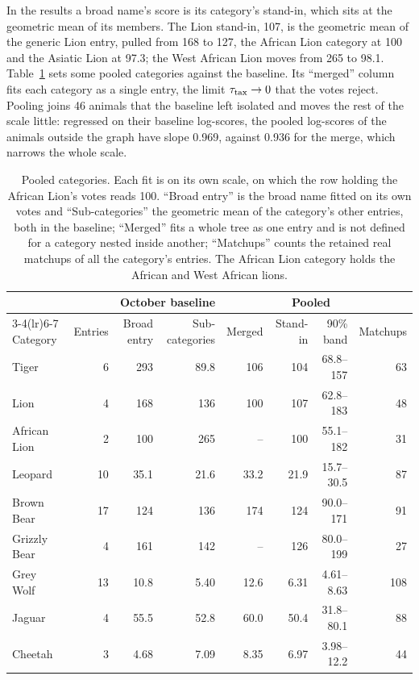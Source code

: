 \documentclass[11pt]{article}
\begin{document}
In the results a broad name's score is its category's stand-in, which sits at the geometric mean of its members. The Lion stand-in, 107, is the geometric mean of the generic Lion entry, pulled from 168 to 127, the African Lion category at 100 and the Asiatic Lion at 97.3; the West African Lion moves from 265 to 98.1. Table~\ref{tab:pooling} sets some pooled categories against the baseline. Its ``merged'' column fits each category as a single entry, the limit $\tau_{\rm tax}\to0$ that the votes reject. Pooling joins 46 animals that the baseline left isolated and moves the rest of the scale little: regressed on their baseline log-scores, the pooled log-scores of the animals outside the graph have slope 0.969, against 0.936 for the merge, which narrows the whole scale.

\begin{table}[H]
\centering
\footnotesize
\setlength{\tabcolsep}{4pt}
\begin{tabular}{lrrrrrrr}
\toprule
& & \multicolumn{2}{c}{October baseline} & & \multicolumn{2}{c}{Pooled} & \\
\cmidrule(lr){3-4}\cmidrule(lr){6-7}
Category & Entries & Broad entry & Sub-categories & Merged & Stand-in & 90\% band & Matchups \\
\midrule
Tiger & 6 & 293 & 89.8 & 106 & 104 & 68.8--157 & 63 \\
Lion & 4 & 168 & 136 & 100 & 107 & 62.8--183 & 48 \\
African Lion & 2 & 100 & 265 & -- & 100 & 55.1--182 & 31 \\
Leopard & 10 & 35.1 & 21.6 & 33.2 & 21.9 & 15.7--30.5 & 87 \\
Brown Bear & 17 & 124 & 136 & 174 & 124 & 90.0--171 & 91 \\
Grizzly Bear & 4 & 161 & 142 & -- & 126 & 80.0--199 & 27 \\
Grey Wolf & 13 & 10.8 & 5.40 & 12.6 & 6.31 & 4.61--8.63 & 108 \\
Jaguar & 4 & 55.5 & 52.8 & 60.0 & 50.4 & 31.8--80.1 & 88 \\
Cheetah & 3 & 4.68 & 7.09 & 8.35 & 6.97 & 3.98--12.2 & 44 \\
\bottomrule
\end{tabular}
\caption{Pooled categories. Each fit is on its own scale, on which the row holding the African Lion's votes reads 100. ``Broad entry'' is the broad name fitted on its own votes and ``Sub-categories'' the geometric mean of the category's other entries, both in the baseline; ``Merged'' fits a whole tree as one entry and is not defined for a category nested inside another; ``Matchups'' counts the retained real matchups of all the category's entries. The African Lion category holds the African and West African lions.}
\label{tab:pooling}
\end{table}
\end{document}
